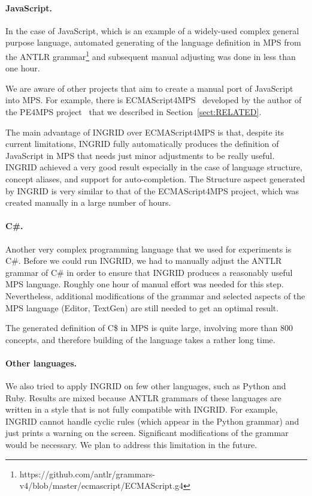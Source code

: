 \paragraph{JavaScript.}
In the case of JavaScript, which is an example of a widely-used complex general purpose language, automated generating of the language definition in MPS from the ANTLR grammar\footnote{https://github.com/antlr/grammars-v4/blob/master/ecmascript/ECMAScript.g4} and subsequent manual adjusting was done in less than one hour.

We are aware of other projects that aim to create a manual port of JavaScript into MPS.
For example, there is ECMAScript4MPS~\cite{ref:ECMA4MPS} developed by the author of the PE4MPS project~\cite{ref:PE4MPS} that we described in Section~\ref{sect:RELATED}.

The main advantage of INGRID over ECMAScript4MPS is that, despite its current limitations, INGRID fully automatically produces the definition of JavaScript in MPS that needs just minor adjustments to be really useful.
INGRID achieved a very good result especially in the case of language structure, concept aliases, and support for auto-completion.
The Structure aspect generated by INGRID is very similar to that of the ECMAScript4MPS project, which was created manually in a large number of hours.

\paragraph{C\#.}
Another very complex programming language that we used for experiments is C\#.
Before we could run INGRID, we had to manually adjust the ANTLR grammar of C\# in order to ensure that INGRID produces a reasonably useful MPS language.
Roughly one hour of manual effort was needed for this step.
Nevertheless, additional modifications of the grammar and selected aspects of the MPS language (Editor, TextGen) are still needed to get an optimal result.

The generated definition of C\$ in MPS is quite large, involving more than 800 concepts, and therefore building of the language takes a rather long time.

\paragraph{Other languages.}
We also tried to apply INGRID on few other languages, such as Python and Ruby.
Results are mixed because ANTLR grammars of these languages are written in a style that is not fully compatible with INGRID.
For example, INGRID cannot handle cyclic rules (which appear in the Python grammar) and just prints a warning on the screen.
Significant modifications of the grammar would be necessary.
We plan to address this limitation in the future.


